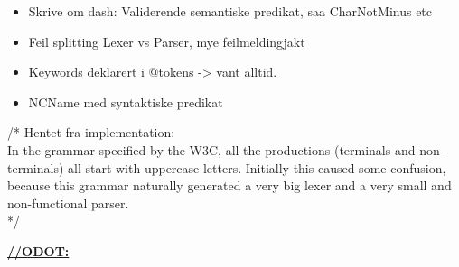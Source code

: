 \begin{itemize}
\item Skrive om dash: Validerende semantiske predikat, saa CharNotMinus etc
\item Feil splitting Lexer vs Parser, mye feilmeldingjakt
\item Keywords deklarert i @tokens -> vant alltid.

\item NCName med syntaktiske predikat
\end{itemize}

/* Hentet fra implementation: \\
In the grammar specified by the W3C, all the productions (terminals and
non-terminals) all start with uppercase letters. Initially this caused some
confusion, because this grammar naturally generated a very big lexer and a very
small and non-functional parser. \\
*/

\underline{\textbf{\LARGE //ODOT:}}


